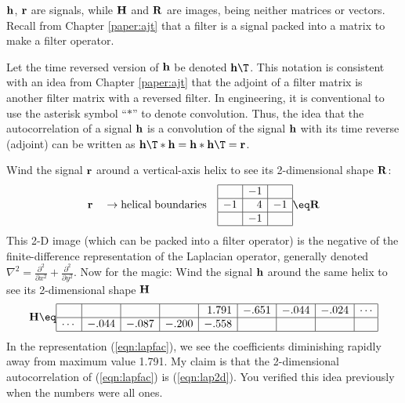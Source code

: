 $\bold h$, $\bold r$ are signals,
while
$\bold H$ and $\bold R$ are images,
being neither matrices or vectors.
Recall from Chapter \ref{paper:ajt} that a filter is a signal
packed into a matrix to make a filter operator.
\par
Let the time reversed version of
$\bold h$
be denoted
$\bold h\T$.
This notation is consistent with an idea from
Chapter \ref{paper:ajt} that the adjoint of a filter matrix
is another filter matrix with a reversed filter.
In engineering, it is conventional to use the asterisk symbol
``$\ast$'' to denote convolution.
Thus, the idea that the autocorrelation of a 
signal $\bold h$
is a convolution of the
signal $\bold h$
with its time reverse (adjoint)
can be written as
$ {\bold h}\T \ast {\bold h} = {\bold h} \ast {\bold h}\T = {\bold r}$.
\par
Wind the signal $\bold r$ around a
vertical-axis helix to see its 2-dimensional shape $\bold R$:
\begin{equation}
\bold r
\quad
\rightarrow{\rm helical \; boundaries}
\quad
\begin{array}{|r|r|r|}  \hline
& -1 & \\
\hline
-1 & 4 & -1\\
\hline
& -1 & \\
\hline
\end{array}
\eq
\bold R
\label{eqn:lap2d}
\end{equation}
This 2-D image (which can be packed into a filter operator)
is the negative of the finite-difference representation
of the Laplacian operator, generally denoted
$\nabla^2 = \frac{\partial^2}{ \partial x^2} + \frac{\partial^2}{ \partial y^2} $.
Now for the magic:
Wind the signal $\bold h$ around the same helix
to see its 2-dimensional shape $\bold H$
\begin{equation}
\label{eqn:lapfac}
 {\bold H}
\eq
    \begin{array} {|r|r|r|r|r|r|r|r|r|} \hline
             &      &       &       & 1.791 &  -.651 & -.044  & -.024& \cdots \\
	     \hline 
      \cdots &-.044 & -.087 & -.200 & -.558 &        &        &      &
     \\ \hline
    \end{array}
\end{equation}
In the representation (\ref{eqn:lapfac}), we see the coefficients diminishing
rapidly away from maximum value 1.791.
My claim is that the 2-dimensional autocorrelation of (\ref{eqn:lapfac})
is (\ref{eqn:lap2d}).
You verified this idea previously when the numbers were all ones.
